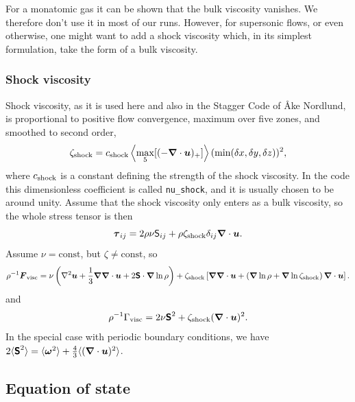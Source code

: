 \documentclass[\mydriver,12pt,twoside,notitlepage,a4paper]{article}
\newcommand{\code}[1]{\texttt{#1}}
\renewcommand{\vec}[1]{\mbox{\boldmath{$#1$}}}
\newcommand{\grad}    {\vec{\nabla}}
\newcommand{\Div}     {\vec{\nabla}\cdot}
\newcommand{\Laplace} {\nabla^2}
\newcommand{\uv}            {\vec{u}}
\newcommand{\omv}           {\boldsymbol{\omega}}
\newcommand{\Strain}        {\boldsymbol{\mathsf{S}}}
\newcommand{\nab}{\mbox{\boldmath $\nabla$} {}}
\begin{document}
For a monatomic gas it can be shown that the bulk viscosity vanishes.
We therefore don't use it in most of our runs.
However, for supersonic flows, or even otherwise, one might want to add a
shock viscosity which, in its simplest formulation, take the form of a
bulk viscosity.

\subsubsection{Shock viscosity}
\label{ShockViscosity}

Shock viscosity, as it is used here and also in the Stagger Code of {\AA}ke Nordlund,
is proportional to positive flow convergence, maximum over
five zones, and smoothed to second order,
\begin{equation}
\zeta_{\rm shock}=c_{\rm shock}\left<\max_5[(-\Div\uv)_+]\right>(\min(\delta x,\delta y,\delta z))^2,
\end{equation}
where $c_{\rm shock}$ is a constant defining the strength of the shock viscosity.
In the code this dimensionless coefficient is called \code{nu_shock}, and it
is usually chosen to be around unity.
Assume that the shock viscosity only enters as a bulk viscosity,
so the whole stress tensor is then
\begin{equation}
\vec{\tau}_{ij}=2\rho\nu{\sf S}_{ij}+\rho\zeta_{\rm shock}\delta_{ij}\nab\cdot\uv.
\end{equation}
Assume $\nu=\mbox{const}$, but $\zeta\neq\mbox{const}$, so
\begin{equation}
\rho^{-1}\vec{F}_{\rm visc}=
\nu\left(\Laplace\uv+\frac{1}{3}\grad\Div\uv+2\Strain\cdot\grad\ln\rho\right)
+\zeta_{\rm shock}\left[\grad\Div\uv+\left(\grad\ln\rho+\grad\ln\zeta_{\rm shock}\right)\Div\uv\right].
\end{equation}
and
\begin{equation}
\rho^{-1}\Gamma_{\rm visc}=2\nu\Strain^2+\zeta_{\rm shock}(\Div\uv)^2.
\end{equation}
In the special case with periodic boundary conditions, we have
$2\langle\Strain^2\rangle=\langle\omv^2\rangle+{4\over3}\langle(\nab\cdot\uv)^2\rangle$.


\subsection{Equation of state}
\label{S-eos}
\end{document}
